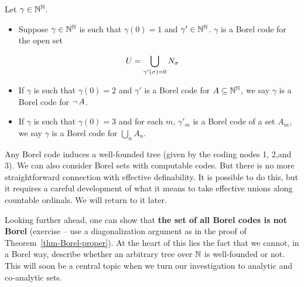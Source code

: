 \begin{definition}\label{def-borel-codes-transfinite}Let $\gamma \in \mathbb{N}^{\mathbb{N}}$.

\begin{itemize}
\item Suppose $\gamma \in \mathbb{N}^{\mathbb{N}}$ is such that $\gamma(0) = 1$ and $\gamma' \in \mathbb{N}^{\mathbb{N}}$. $\gamma$ is a Borel code for the open set
\end{itemize}
\begin{equation*}
U = \bigcup_{\gamma'(\sigma) = 0} N_{\sigma}
\end{equation*}

\begin{itemize}
\item If $\gamma$ is such that $\gamma(0)=2$ and $\gamma'$ is a Borel code for $A \subseteq \mathbb{N}^{\mathbb{N}}$, we say $\gamma$ is a Borel code for $\neg \, A$.


\item If $\gamma$ is such that $\gamma(0)=3$ and for each $m$, $\gamma'_m$ is a Borel code of a set $A_m$, we say $\gamma$ is a Borel code for $\bigcup_n A_n$.
\end{itemize}

\end{definition}Any Borel code induces a well-founded tree (given by the coding nodes 1, 2,and 3). We can also consider Borel sets with computable codes. But there is no more straightforward connection with effective definability. It is possible to do this, but it requires a careful development of what it means to take effective unions along countable ordinals. We will return to it later.

Looking further ahead, one can show that \textbf{the set of all Borel codes is not Borel} (exercise -- use a diagonalization argument as in the proof of Theorem~\ref{thm-Borel-proper}). At the heart of this lies the fact that we cannot, in a Borel way, describe whether an arbitrary tree over $\mathbb{N}$ is well-founded or not. This will soon be a central topic when we turn our investigation to analytic and co-analytic sets.

% 
%
